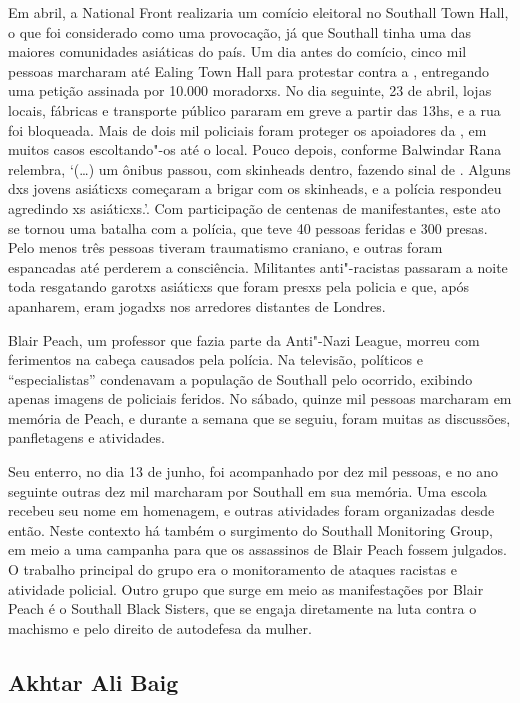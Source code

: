 Em abril, a National Front realizaria um comício eleitoral no Southall Town Hall, o que foi considerado como uma provocação, já que Southall tinha uma das maiores comunidades asiáticas do país. Um dia antes do comício, cinco mil pessoas marcharam até Ealing Town Hall para protestar contra a , entregando uma petição assinada por 10.000 moradorxs. No dia seguinte, 23 de abril, lojas locais, fábricas e transporte público pararam em greve a partir das 13hs, e a rua foi bloqueada. Mais de dois mil policiais foram proteger os apoiadores da , em muitos casos escoltando"-os até o local. Pouco depois, conforme Balwindar Rana relembra, `(\ldots{}) um ônibus passou, com skinheads dentro, fazendo sinal de . Alguns dxs jovens asiáticxs começaram a brigar com os skinheads, e a polícia respondeu agredindo xs asiáticxs.'. Com participação de centenas de manifestantes, este ato se tornou uma batalha com a polícia, que teve 40 pessoas feridas e 300 presas. Pelo menos três pessoas tiveram traumatismo craniano, e outras foram espancadas até perderem a consciência. Militantes anti"-racistas passaram a noite toda resgatando garotxs asiáticxs que foram presxs pela policia e que, após apanharem, eram jogadxs nos arredores distantes de Londres. 




Blair Peach, um professor que fazia parte da Anti"-Nazi League, morreu com ferimentos na cabeça causados pela polícia. Na televisão, políticos e ``especialistas'' condenavam a população de Southall pelo ocorrido, exibindo apenas imagens de policiais feridos. No sábado, quinze mil pessoas marcharam em memória de Peach, e durante a semana que se seguiu, foram muitas as discussões, panfletagens e atividades.

Seu enterro, no dia 13 de junho, foi acompanhado por dez mil pessoas, e no ano seguinte outras dez mil marcharam por Southall em sua memória. Uma escola recebeu seu nome em homenagem, e outras atividades foram organizadas desde então. Neste contexto há também o surgimento do Southall Monitoring Group, em meio a uma campanha para que os assassinos de Blair Peach fossem julgados. O trabalho principal do grupo era o monitoramento de ataques racistas e atividade policial. Outro grupo que surge em meio as manifestações por Blair Peach é o Southall Black Sisters, que se engaja diretamente na luta contra o machismo e pelo direito de autodefesa da mulher.


\subsection{Akhtar Ali Baig}

